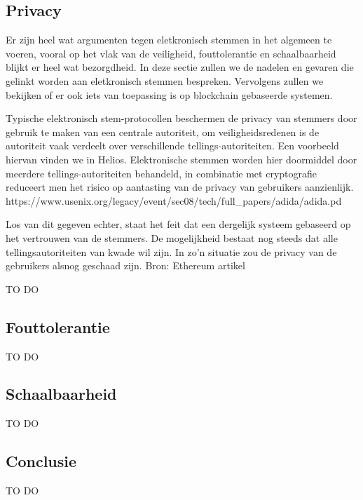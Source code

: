 	
	\subsection{Privacy} 
		Er zijn heel wat argumenten tegen eletkronisch stemmen in het algemeen te voeren, vooral op het vlak van de veiligheid, fouttolerantie en schaalbaarheid blijkt er heel wat bezorgdheid. In deze sectie zullen we de nadelen en gevaren die gelinkt worden aan eletkronisch stemmen bespreken. Vervolgens zullen we bekijken of er ook iets van toepassing is op blockchain gebaseerde systemen.
		
		Typische elektronisch stem-protocollen beschermen de privacy van stemmers door gebruik te maken van een centrale autoriteit, om veiligheidsredenen is de autoriteit vaak verdeelt over verschillende tellings-autoriteiten. Een voorbeeld hiervan vinden we in Helios. Elektronische stemmen worden hier doormiddel door meerdere tellings-autoriteiten behandeld, in combinatie met cryptografie reduceert men het risico op aantasting van de privacy van gebruikers aanzienlijk. https://www.usenix.org/legacy/event/sec08/tech/full_papers/adida/adida.pd
		
		Los van dit gegeven echter, staat het feit dat een dergelijk systeem gebaseerd op het vertrouwen van de stemmers. De mogelijkheid bestaat nog steeds dat alle tellingsautoriteiten van kwade wil zijn. In zo’n situatie zou de privacy van de gebruikers alsnog geschaad zijn.  Bron: Ethereum artikel
		
		TO DO
	\subsection{Fouttolerantie}
		TO DO
	\subsection{Schaalbaarheid}
		TO DO
	\subsection{Conclusie}
		TO DO
